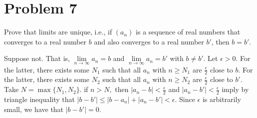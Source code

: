 \documentclass[11pt]{article}
\begin{document}
\newpage
\section*{Problem 7}
\begin{problem}
    Prove that limits are unique, i.e., if $(a_n)$ is a sequence of real numbers that converges to a real number $b$ and also converges to a real number $b'$, then $b =b'.$
\end{problem}
\begin{solution}
    Suppose not. That is, $\lim\limits_{n\to \infty} a_n = b$ and $\lim\limits_{n\to \infty} a_n = b'$ with $b \neq b'.$ Let $\epsilon>0.$ For the latter, there exists some $N_1$ such that all $a_n$ with $n\geq N_1$ are $\frac{\epsilon}{2}$ close to $b.$ For the latter, there exists some $N_2$ such that all $a_n$ with $n\geq N_2$ are $\frac{\epsilon}{2}$ close to $b'.$ Take $N  = \max\{N_1, N_2\}.$ if $n>N,$ then $|a_n - b|< \frac{\epsilon}{2}$ and $|a_n - b'|<\frac{\epsilon}{2}$ imply by triangle inequality that $|b-b'|\leq |b-a_n| + |a_n - b'| < \epsilon.$ Since $\epsilon$ is arbitrarily small, we have that $|b  - b'| = 0.$
\end{solution}

\newpage
\end{document}
